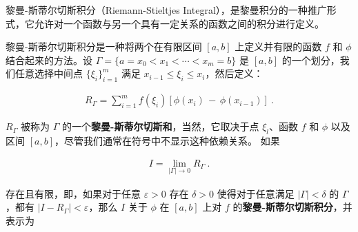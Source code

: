 
黎曼-斯蒂尔切斯积分（Riemann-Stieltjes Integral），是黎曼积分的一种推广形式，它允许对一个函数与另一个具有一定关系的函数之间的积分进行定义。

黎曼-斯蒂尔切斯积分是一种将两个在有限区间 $ [a, b] $ 上定义并有限的函数 $ f $ 和 $ \phi $ 结合起来的方法。设 $ \Gamma=\{a=x_{0}<x_{1}<\cdots<x_{m}=b\} $ 是 $ [a, b] $ 的一个划分，我们任意选择中间点 $ \{\xi_{i}\}_{i=1}^{m} $ 满足 $ x_{i-1}\leq\xi_{i}\leq x_{i} $，然后定义：

\begin{align}
R_{\Gamma}=\sum_{i=1}^{m}f(\xi_{i})[\phi(x_{i})\,-\,\phi(x_{i-1})]~.
\end{align}

$ R_{\Gamma} $ 被称为 $ \Gamma $ 的一个\textbf{黎曼-斯蒂尔切斯和}，当然，它取决于点 $ \xi_{l} $、函数 $ f $ 和 $ \phi $ 以及区间 $ [a, b] $，尽管我们通常在符号中不显示这种依赖关系。
如果

\begin{align}
I=\lim_{|\Gamma|\to0}R_{\Gamma}~.
\end{align}

存在且有限，即，如果对于任意 $ \varepsilon>0 $ 存在 $ \delta>0 $ 使得对于任意满足 $ |\Gamma|<\delta $ 的 $ \Gamma $，都有 $ |I-R_{\Gamma}|<\varepsilon $，那么 $ I $ 关于 $ \phi $ 在 $ [a, b] $ 上对 $ f $ 的\textbf{黎曼-斯蒂尔切斯积分}，并表示为